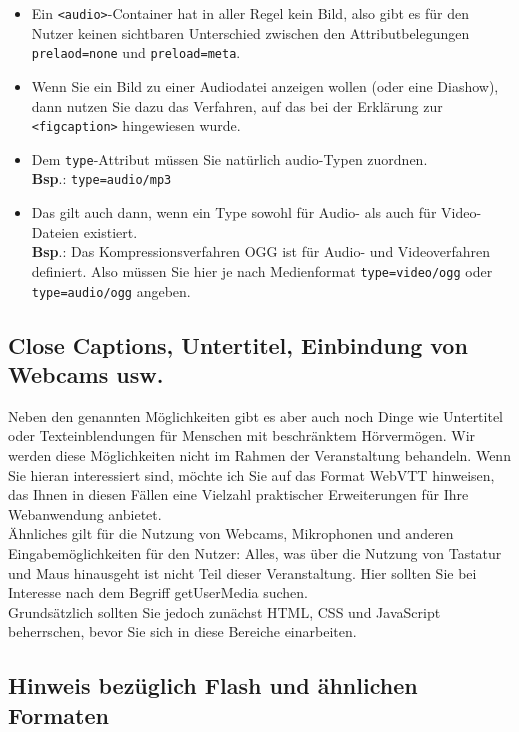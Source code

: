 \begin{itemize}
	\item Ein \verb|<audio>|-Container hat in aller Regel kein Bild, also gibt es für den Nutzer keinen sichtbaren Unterschied zwischen den Attributbelegungen \verb|prelaod=none| und \verb|preload=meta|.
	\item Wenn Sie ein Bild zu einer Audiodatei anzeigen wollen (oder eine Diashow), dann nutzen Sie dazu das Verfahren, auf das bei der Erklärung zur \verb|<figcaption>| hingewiesen wurde.
	\item Dem \verb|type|-Attribut müssen Sie natürlich audio-Typen zuordnen.\\
	\textbf{Bsp}.: \verb|type=audio/mp3|\\
	\item Das gilt auch dann, wenn ein Type sowohl für Audio- als auch für Video-Dateien existiert.\\
	\textbf{Bsp}.: Das Kompressionsverfahren OGG ist für Audio- und Videoverfahren definiert. Also müssen Sie hier je nach Medienformat \verb|type=video/ogg| oder \verb|type=audio/ogg| angeben.
\end{itemize}

\subsection{Close Captions, Untertitel, Einbindung von Webcams usw.}

Neben den genannten Möglichkeiten gibt es aber auch noch Dinge wie Untertitel oder Texteinblendungen für Menschen mit beschränktem Hörvermögen. Wir werden diese Möglichkeiten nicht im Rahmen der Veranstaltung behandeln. Wenn Sie hieran interessiert sind, möchte ich Sie auf das Format WebVTT hinweisen, das Ihnen in diesen Fällen eine Vielzahl praktischer Erweiterungen für Ihre Webanwendung anbietet.\\

Ähnliches gilt für die Nutzung von Webcams, Mikrophonen und anderen Eingabemöglichkeiten für den Nutzer: Alles, was über die Nutzung von Tastatur und Maus hinausgeht ist nicht Teil dieser Veranstaltung. Hier sollten Sie bei Interesse nach dem Begriff getUserMedia suchen.\\

Grundsätzlich sollten Sie jedoch zunächst HTML, CSS und JavaScript beherrschen, bevor Sie sich in diese Bereiche einarbeiten.

\subsection{Hinweis bezüglich Flash und ähnlichen Formaten}

